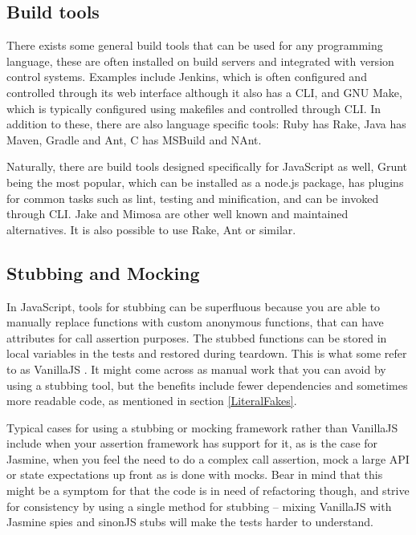 \documentclass[11pt]{article}
\begin{document}
\subsection{Build tools} %

There exists some general build tools that can be used for any programming language, these are often installed on build servers and integrated with version control systems. Examples include Jenkins, which is often configured and controlled through its web interface although it also has a CLI, and GNU Make, which is typically configured using makefiles and controlled through CLI. In addition to these, there are also language specific tools: Ruby has Rake, Java has Maven, Gradle and Ant, C\nolinebreak\hspace{-.05em}\raisebox{.3ex}{\scriptsize\bf \#} has MSBuild and NAnt.

Naturally, there are build tools designed specifically for JavaScript as well, Grunt being the most popular, which can be installed as a node.js package, has plugins for common tasks such as lint, testing and minification, and can be invoked through CLI. \cite{Grunt}\cite[question~52]{Edelstam} Jake and Mimosa are other well known and maintained alternatives. It is also possible to use Rake, Ant or similar. \cite{BuildTools}

\subsection{Stubbing and Mocking} %

In JavaScript, tools for stubbing can be superfluous because you are able to manually replace functions with custom anonymous functions, that can have attributes for call assertion purposes. The stubbed functions can be stored in local variables in the tests and restored during teardown. This is what some refer to as VanillaJS \cite[question~53]{Edelstam}. It might come across as manual work that you can avoid by using a stubbing tool, but the benefits include fewer dependencies and sometimes more readable code, as mentioned in section \ref{LiteralFakes}. \cite[questions~54-55]{Edelstam}

Typical cases for using a stubbing or mocking framework rather than VanillaJS include when your assertion framework has support for it, as is the case for Jasmine, when you feel the need to do a complex call assertion, mock a large API or state expectations up front as is done with mocks. Bear in mind that this might be a symptom for that the code is in need of refactoring though, and strive for consistency by using a single method for stubbing -- mixing VanillaJS with Jasmine spies and sinonJS stubs will make the tests harder to understand.
\end{document}

